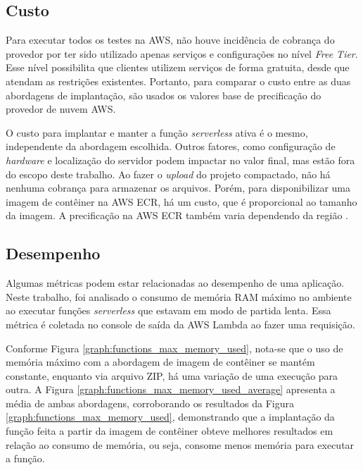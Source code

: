 \documentclass[conference]{IEEEtran}
\begin{document}
\subsection{Custo}
\label{subsec:cost}

Para executar todos os testes na AWS, não houve incidência de cobrança do provedor por ter sido utilizado apenas serviços e configurações no nível \textit{Free Tier}. Esse nível possibilita que clientes utilizem serviços de forma gratuita, desde que atendam as restrições existentes. Portanto, para comparar o custo entre as duas abordagens de implantação, são usados os valores base de precificação do provedor de nuvem AWS.

O custo para implantar e manter a função \textit{serverless} ativa é o mesmo, independente da abordagem escolhida. Outros fatores, como configuração de \textit{hardware} e localização do servidor podem impactar no valor final, mas estão fora do escopo deste trabalho.
Ao fazer o \textit{upload} do projeto compactado, não há nenhuma cobrança para armazenar os arquivos. Porém, para disponibilizar uma imagem de contêiner na AWS ECR, há um custo, que é proporcional ao tamanho da imagem. A precificação na AWS ECR também varia dependendo da região \cite{aws_2023_ecr_pricing}. 

\subsection{Desempenho}
\label{subsec:performance}

Algumas métricas podem estar relacionadas ao desempenho de uma aplicação. Neste trabalho, foi analisado o consumo de memória RAM máximo no ambiente ao executar funções \textit{serverless} que estavam em modo de partida lenta. Essa métrica é coletada no console de saída da AWS Lambda ao fazer uma requisição.

Conforme Figura \ref{graph:functions_max_memory_used}, nota-se que o uso de memória máximo com a abordagem de imagem de contêiner se mantém constante, enquanto via arquivo ZIP, há uma variação de uma execução para outra. A Figura \ref{graph:functions_max_memory_used_average} apresenta a média de ambas abordagens, corroborando os resultados da Figura \ref{graph:functions_max_memory_used}, demonstrando que a implantação da função feita a partir da imagem de contêiner obteve melhores resultados em relação ao consumo de memória, ou seja, consome menos memória para executar a função. 
\end{document}
